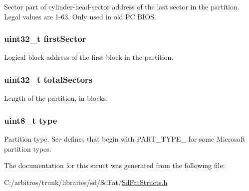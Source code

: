 Sector part of cylinder-\/head-\/sector address of the last sector in the partition. Legal values are 1-\/63. Only used in old P\-C B\-I\-O\-S. \hypertarget{structpartition_table_a5951cd74127d45180071909972899c0e}{
\subsubsection[{first\-Sector}]{\setlength{\rightskip}{0pt plus 5cm}uint32\-\_\-t first\-Sector}}\label{structpartition_table_a5951cd74127d45180071909972899c0e}
Logical block address of the first block in the partition. \hypertarget{structpartition_table_ab3559f69d4a46a945bd4c037070585f2}{
\subsubsection[{total\-Sectors}]{\setlength{\rightskip}{0pt plus 5cm}uint32\-\_\-t total\-Sectors}}\label{structpartition_table_ab3559f69d4a46a945bd4c037070585f2}
Length of the partition, in blocks. \hypertarget{structpartition_table_a1d127017fb298b889f4ba24752d08b8e}{
\subsubsection[{type}]{\setlength{\rightskip}{0pt plus 5cm}uint8\-\_\-t type}}\label{structpartition_table_a1d127017fb298b889f4ba24752d08b8e}
Partition type. See defines that begin with P\-A\-R\-T\-\_\-\-T\-Y\-P\-E\-\_\- for some Microsoft partition types. 

The documentation for this struct was generated from the following file\-:\begin{DoxyCompactItemize}
\item 
C\-:/arbitros/trunk/libraries/sd/\-Sd\-Fat/\hyperlink{_sd_fat_structs_8h}{Sd\-Fat\-Structs.\-h}\end{DoxyCompactItemize}
